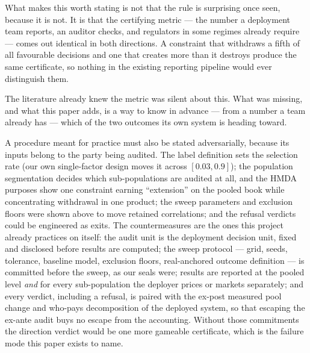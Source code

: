\documentclass[9pt,conference]{IEEEtran}
\begin{document}
What makes this worth stating is not that the rule is surprising once seen, because it is
not. It is that the certifying metric --- the number a deployment team reports, an auditor
checks, and regulators in some regimes already require --- comes out identical in both directions. A
constraint that withdraws a fifth of all favourable decisions and one that creates more than
it destroys produce the same certificate, so nothing in the existing reporting pipeline
would ever distinguish them.

The literature already knew the metric was silent about this. What was missing, and what
this paper adds, is a way to know in advance --- from a number a team already has --- which
of the two outcomes its own system is heading toward.

A procedure meant for practice must also be stated adversarially, because its inputs
belong to the party being audited. The label definition sets the selection rate (our own
single-factor design moves it across $[0.03, 0.9]$); the population segmentation decides
which sub-populations are audited at all, and the HMDA purposes show one constraint
earning ``extension'' on the pooled book while concentrating withdrawal in one product;
the sweep parameters and exclusion floors were shown above to move retained correlations;
and the refusal verdicts could be engineered as exits. The countermeasures are the ones
this project already practices on itself: the audit unit is the deployment decision unit,
fixed and disclosed before results are computed; the sweep protocol --- grid, seeds,
tolerance, baseline model, exclusion floors, real-anchored outcome definition --- is
committed before the sweep, as our seals were; results are reported at the pooled level
\emph{and} for every sub-population the deployer prices or markets separately; and every
verdict, including a refusal, is paired with the ex-post measured pool change and
who-pays decomposition of the deployed system, so that escaping the ex-ante audit buys no
escape from the accounting. Without those commitments the direction verdict would be one
more gameable certificate, which is the failure mode this paper exists to name.
\end{document}
